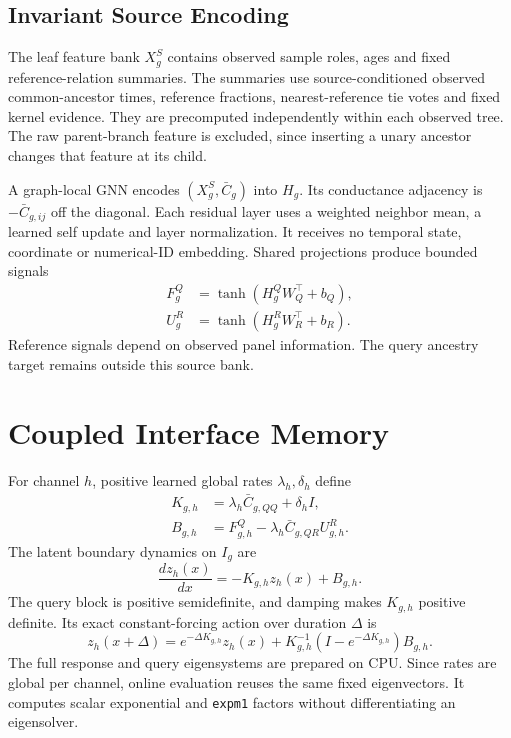 \documentclass[letterpaper]{article}
\begin{document}
\subsection{Invariant Source Encoding}
The leaf feature bank $X_g^S$ contains observed sample roles, ages and fixed reference-relation summaries. The summaries use source-conditioned observed common-ancestor times, reference fractions, nearest-reference tie votes and fixed kernel evidence. They are precomputed independently within each observed tree. The raw parent-branch feature is excluded, since inserting a unary ancestor changes that feature at its child.

A graph-local GNN encodes $(X_g^S,\bar C_g)$ into $H_g$. Its conductance adjacency is $-\bar C_{g,ij}$ off the diagonal. Each residual layer uses a weighted neighbor mean, a learned self update and layer normalization. It receives no temporal state, coordinate or numerical-ID embedding. Shared projections produce bounded signals
\begin{align}
 F_g^Q&=\tanh(H_g^QW_Q^\top+b_Q),\\
 U_g^R&=\tanh(H_g^RW_R^\top+b_R).
\end{align}
Reference signals depend on observed panel information. The query ancestry target remains outside this source bank.

\section{Coupled Interface Memory}
For channel $h$, positive learned global rates $\lambda_h,\delta_h$ define
\begin{align}
 K_{g,h}&=\lambda_h\bar C_{g,QQ}+\delta_h I,\\
 B_{g,h}&=F_{g,h}^Q-\lambda_h\bar C_{g,QR}U_{g,h}^R.
\end{align}
The latent boundary dynamics on $I_g$ are
\begin{equation}
 \frac{d z_h(x)}{dx}=-K_{g,h}z_h(x)+B_{g,h}.
\end{equation}
The query block is positive semidefinite, and damping makes $K_{g,h}$ positive definite. Its exact constant-forcing action over duration $\Delta$ is
\begin{equation}
 z_h(x+\Delta)=e^{-\Delta K_{g,h}}z_h(x)
 +K_{g,h}^{-1}(I-e^{-\Delta K_{g,h}})B_{g,h}.
\end{equation}
The full response and query eigensystems are prepared on CPU. Since rates are global per channel, online evaluation reuses the same fixed eigenvectors. It computes scalar exponential and \texttt{expm1} factors without differentiating an eigensolver.
\end{document}
